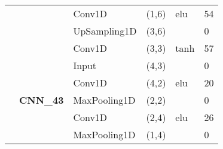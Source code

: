\begin{table}[H]
\begin{center}
\begin{tabular}{ll|l|l|l|l|}
\multicolumn{1}{|l|}{}                                                                  &                                   & Conv1D                             & (1,6)                                & elu                                     & 54                                          \\ \cline{3-6} 
\multicolumn{1}{|l|}{}                                                                  &                                   & UpSampling1D                       & (3,6)                                &                                          & 0                                           \\ \cline{3-6} 
\multicolumn{1}{|l|}{}                                                                  &                                   & Conv1D                             & (3,3)                                & tanh                                     & 57                                          \\ \cline{2-6} 
\multicolumn{1}{|l|}{}                                                                  & \multirow{8}{*}{\textbf{CNN\_43}} & Input                              & (4,3)                                &                                          & 0                                           \\ \cline{3-6} 
\multicolumn{1}{|l|}{}                                                                  &                                   & Conv1D                             & (4,2)                                & elu                                     & 20                                          \\ \cline{3-6} 
\multicolumn{1}{|l|}{}                                                                  &                                   & MaxPooling1D                       & (2,2)                                &                                          & 0                                           \\ \cline{3-6} 
\multicolumn{1}{|l|}{}                                                                  &                                   & Conv1D                             & (2,4)                                & elu                                     & 26                                          \\ \cline{3-6} 
\multicolumn{1}{|l|}{}                                                                  &                                   & MaxPooling1D                       & (1,4)                                &                                          & 0                                           \\ \cline{3-6} 

\end{tabular}
\end{center}
\end{table}
